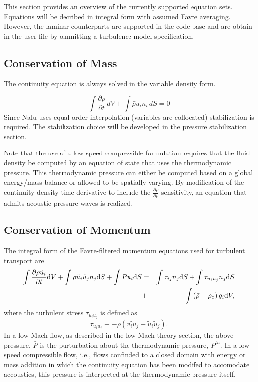 This section provides an overview of the currently supported
equation sets. Equations will be decribed in integral form with
assumed Favre averaging. However, the laminar counterparts
are supported in the code base and are obtain in the user file
by ommitting a turbulence model specification.

\subsection{Conservation of Mass}
The continuity equation is always solved in the variable density form.

\begin{equation}
\int \frac{\partial \bar{\rho}} {\partial t}\, dV
+ \int \bar{\rho} \tilde{u}_i  n_i\, dS = 0
\end{equation}
Since Nalu uses equal-order interpolation (variables are collocated)
stabilization is required. The stabilization choice will be developed
in the pressure stabilization section.

Note that the use of a low speed compressible formulation requires that 
the fluid density be computed by an equation of state that uses the 
thermodynamic pressure. This thermodynamic pressure can either be computed
based on a global energy/mass balance or allowed to be spatially varying.
By modification of the continuity density time derivative to include 
the $\frac{\partial \rho}{\partial p}$ sensitivity,
an equation that admits acoustic pressure waves is realized.

\subsection{Conservation of Momentum}

The integral form of the Favre-filtered momentum equations used for
turbulent transport are
%
\begin{eqnarray}
   \int {{\partial \bar{\rho} \tilde{u}_i} \over {\partial t}} {\rm d}V
  +  \int \bar{\rho} \tilde{u}_i \tilde{u}_j n_j {\rm d}S 
  +  \int \bar{P} n_i {\rm d}S  &=& 
   \int \bar{\tau}_{ij} n_j {\rm d}S 
  + \int \tau_{u_i u_j} n_j {\rm d}S \nonumber \\ 
   &+& \int \left(\bar{\rho} - \rho_{\circ} \right) g_i {\rm d}V,
\label{fav-mom}
\end{eqnarray}
%
where the turbulent stress $\tau_{u_i u_j}$ is defined as
%
\begin{equation}
\tau_{u_i u_j} \equiv - \bar{\rho} ( \widetilde{u_i u_j} - 
     \tilde{u}_i \tilde{u}_j ).
\end{equation}
%
In a low Mach flow, as described in the low Mach theory section, 
the above pressure, $\bar P$ is the purturbation about the thermodynamic
pressure, $P^{th}$. In a low speed compressible flow, i.e., flows confinded to a closed
domain with energy or mass addition in which the continuity equation
has been modifed to accomodate accoustics, this pressure is interpreted at the
thermodynamic pressure itself.

